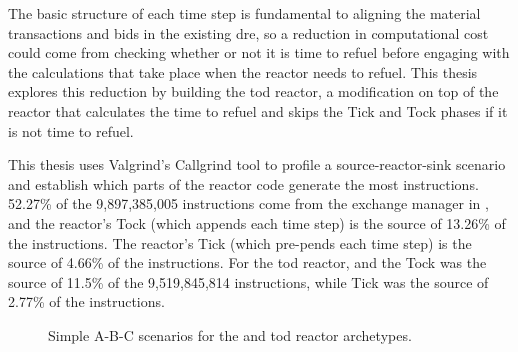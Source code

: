 The basic structure of each time step is fundamental to aligning the material transactions and bids in the existing \gls{dre}, so a reduction in computational cost could come from checking whether or not it is time to refuel before engaging with the calculations that take place when the reactor needs to refuel. This thesis explores this reduction by building the \gls{tod} reactor, a modification on top of the \cycamore reactor that calculates the time to refuel and skips the Tick and Tock phases if it is not time to refuel.

This thesis uses Valgrind's \cite{valgrind} Callgrind \cite{callgrind} tool to profile a source-reactor-sink scenario and establish which parts of the \cycamore reactor code generate the most instructions. 52.27\% of the 9,897,385,005 instructions come from the exchange manager in \cyclus, and the reactor's Tock (which appends each time step) is the source of 13.26\% of the instructions. The \cycamore reactor's Tick (which pre-pends each time step) is the source of 4.66\% of the instructions. For the \gls{tod} reactor, and the Tock was the source of 11.5\% of the 9,519,845,814 instructions, while Tick was the source of 2.77\% of the instructions.


\begin{figure}[H]
    \centering
    \caption{Simple A-B-C scenarios for the \cycamore and \gls{tod} reactor archetypes.}
    \label{fig:abc_tod}
\end{figure}

